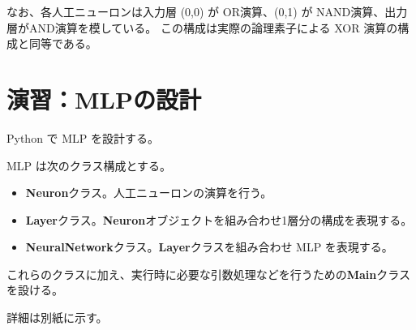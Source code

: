 なお、各人工ニューロンは入力層 (0,0) が OR演算、(0,1) が NAND演算、出力層がAND演算を模している。 
この構成は実際の論理素子による XOR 演算の構成と同等である。

\section{演習：MLPの設計}

Python で MLP を設計する。

MLP は次のクラス構成とする。

\begin{itemize}
    \item \textbf{Neuron}クラス。人工ニューロンの演算を行う。
    \item \textbf{Layer}クラス。\textbf{Neuron}オブジェクトを組み合わせ1層分の構成を表現する。
    \item \textbf{NeuralNetwork}クラス。\textbf{Layer}クラスを組み合わせ MLP を表現する。
\end{itemize}

これらのクラスに加え、実行時に必要な引数処理などを行うための\textbf{Main}クラスを設ける。

詳細は別紙に示す。